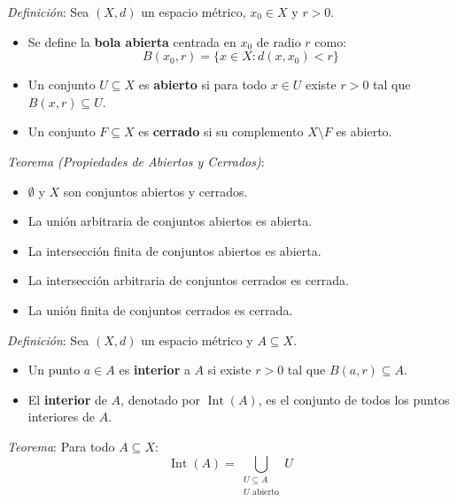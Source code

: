 \documentclass{beamer}
\begin{document}
  \begin{frame}
    \textit{Definición}: Sea $(X, d)$ un espacio métrico, $x_0 \in X$ y $r > 0$.
    \newline

    \begin{itemize}[<+->]
      \item Se define la \textbf{bola abierta} centrada en $x_0$ de radio $r$ como:
            \[ B(x_0, r) = \{x \in X: d(x, x_0) < r\} \]
      \item Un conjunto $U \subseteq X$ es \textbf{abierto} si
            para todo $x \in U$ existe $r > 0$ tal que $B(x, r) \subseteq U$.
      \item Un conjunto $F \subseteq X$ es \textbf{cerrado} si su 
            complemento $X \setminus F$ es abierto.
    \end{itemize}
  \end{frame}

  \begin{frame}
    \textit{Teorema (Propiedades de Abiertos y Cerrados)}:
    \newline

    \begin{itemize}[<+->]
      \item $\emptyset$ y $X$ son conjuntos abiertos y cerrados.
      \item La unión arbitraria de conjuntos abiertos es abierta.
      \item La intersección finita de conjuntos abiertos es abierta.
      \item La intersección arbitraria de conjuntos cerrados es cerrada.
      \item La unión finita de conjuntos cerrados es cerrada.
    \end{itemize}
  \end{frame}

  \begin{frame}
    \textit{Definición}: Sea $(X, d)$ un espacio métrico y $A \subseteq X$.
    \newline
    \begin{itemize}[<+->]
      \item Un punto $a \in A$ es \textbf{interior} a $A$
            si existe $r > 0$ tal que $B(a, r) \subseteq A$.
      \item El \textbf{interior} de $A$, denotado por
            $\operatorname{Int}(A)$, es el conjunto de todos los 
            puntos interiores de $A$.
    \end{itemize}

    \pause

    \vspace{0.5em}
    \textit{Teorema}: Para todo $A \subseteq X$:
    \[ \operatorname{Int}(A) = \bigcup_{\substack{U \subseteq A \\ U \text{ abierto}}} U \]
  \end{frame}
\end{document}
